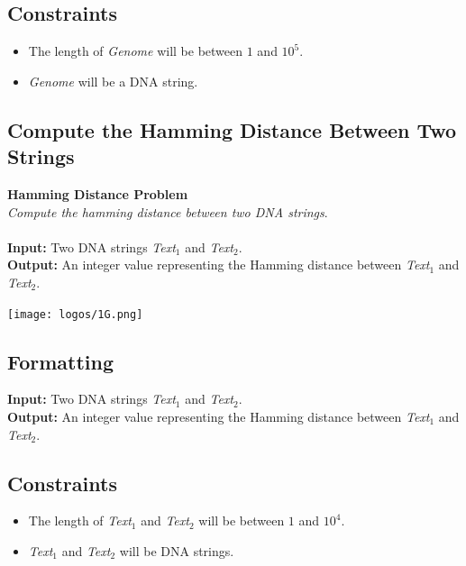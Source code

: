 \documentclass{article}
\begin{document}
\subsection*{Constraints}
\begin{itemize}
    \item The length of \emph{Genome} will be between $1$ and $10^5$.
    \item \emph{Genome} will be a DNA string.
\end{itemize}
\pagebreak
\subsection{Compute the Hamming Distance Between Two Strings}
\hline\vspace{5}
\noindent \textbf{Hamming Distance Problem}\\
\emph{Compute the hamming distance between two DNA strings}.\\ \\
\textbf{Input:} Two DNA strings \emph{Text}$_1$ and \emph{Text}$_2$.\\
\textbf{Output:} An integer value representing the Hamming distance between \emph{Text}$_1$ and \emph{Text}$_2$.
\begin{center}
    \texttt{[image: logos/1G.png]} 
\end{center}
\hline\vspace{5}

\subsection*{Formatting}
\textbf{Input:} Two DNA strings \emph{Text}$_1$ and \emph{Text}$_2$.\\
\noindent \textbf{Output:} An integer value representing the Hamming distance between \emph{Text}$_1$ and \emph{Text}$_2$.

\subsection*{Constraints}
\begin{itemize}
    \item The length of \emph{Text}$_1$ and \emph{Text}$_2$ will be between $1$ and $10^4$.
    \item \emph{Text}$_1$ and \emph{Text}$_2$ will be DNA strings.
\end{itemize}
\pagebreak
\end{document}
